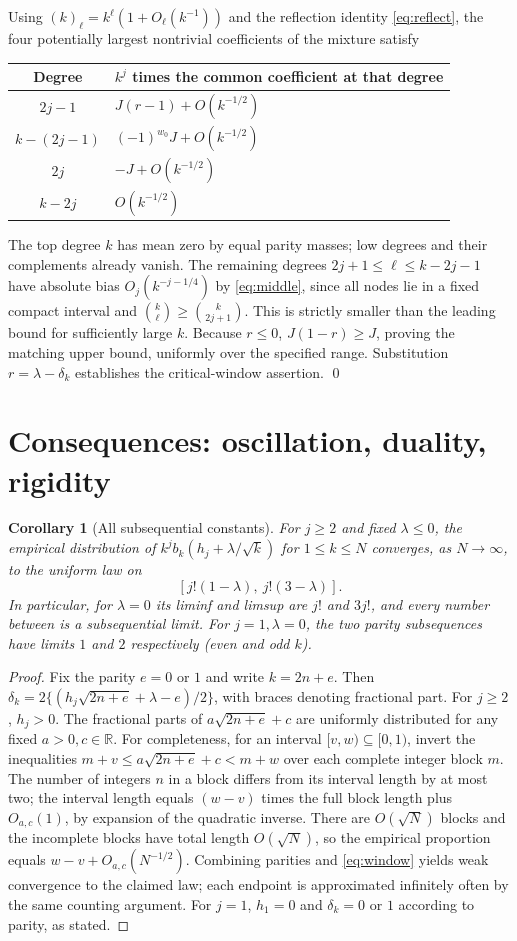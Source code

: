 \documentclass[11pt]{article}
\newtheorem{corollary}[theorem]{Corollary}
\theoremstyle{remark}\newtheorem{remark}[theorem]{Remark}
\newcommand{\R}{\mathbb R}
\begin{document}
Using $(k)_\ell=k^\ell(1+O_\ell(k^{-1}))$ and the reflection identity \eqref{eq:reflect}, the four potentially largest nontrivial coefficients of the mixture satisfy
\begin{center}
\begin{tabular}{@{}cl@{}}
\toprule
Degree & $k^j$ times the common coefficient at that degree\\\midrule
$2j-1$ & $J(r-1)+O(k^{-1/2})$\\
$k-(2j-1)$ & $(-1)^{w_0}J+O(k^{-1/2})$\\
$2j$ & $-J+O(k^{-1/2})$\\
$k-2j$ & $O(k^{-1/2})$\\\bottomrule
\end{tabular}
\end{center}
The top degree $k$ has mean zero by equal parity masses; low degrees and their complements already vanish. The remaining degrees $2j+1\le\ell\le k-2j-1$ have absolute bias $O_j(k^{-j-1/4})$ by \eqref{eq:middle}, since all nodes lie in a fixed compact interval and $\binom{k}{\ell}\ge\binom{k}{2j+1}$. This is strictly smaller than the leading bound for sufficiently large $k$. Because $r\le0$, $J(1-r)\ge J$, proving the matching upper bound, uniformly over the specified range. Substitution $r=\lambda-\delta_k$ establishes the critical-window assertion. \qed

\section{Consequences: oscillation, duality, rigidity}
\begin{corollary}[All subsequential constants]\label{cor:limits}
For $j\ge2$ and fixed $\lambda\le0$, the empirical distribution of $k^j b_k(h_j+\lambda/\sqrt{k})$ for $1\le k\le N$ converges, as $N\to\infty$, to the uniform law on
\[
 [j!(1-\lambda),\ j!(3-\lambda)].
\]
In particular, for $\lambda=0$ its liminf and limsup are $j!$ and $3j!$, and every number between is a subsequential limit. For $j=1,\lambda=0$, the two parity subsequences have limits $1$ and $2$ respectively (even and odd $k$).
\end{corollary}
\begin{proof}
Fix the parity $e=0$ or $1$ and write $k=2n+e$. Then $\delta_k=2\{(h_j\sqrt{2n+e}+\lambda-e)/2\}$, with braces denoting fractional part. For $j\ge2$, $h_j>0$. The fractional parts of $a\sqrt{2n+e}+c$ are uniformly distributed for any fixed $a>0,c\in\R$. For completeness, for an interval $[v,w)\subseteq[0,1)$, invert the inequalities $m+v\le a\sqrt{2n+e}+c<m+w$ over each complete integer block $m$. The number of integers $n$ in a block differs from its interval length by at most two; the interval length equals $(w-v)$ times the full block length plus $O_{a,c}(1)$, by expansion of the quadratic inverse. There are $O(\sqrt{N})$ blocks and the incomplete blocks have total length $O(\sqrt{N})$, so the empirical proportion equals $w-v+O_{a,c}(N^{-1/2})$. Combining parities and \eqref{eq:window} yields weak convergence to the claimed law; each endpoint is approximated infinitely often by the same counting argument. For $j=1$, $h_1=0$ and $\delta_k=0$ or $1$ according to parity, as stated.
\end{proof}
\end{document}
